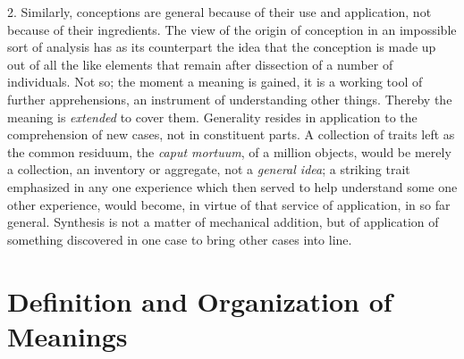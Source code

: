 \documentclass[showtrims,ustradepaper]{memoir}
\begin{document}

2. Similarly, conceptions are general because of their use and
application, not because of their ingredients. The view of the origin of
conception in an impossible sort of analysis has as its counterpart the
idea that the conception is made up out of all the like elements that
remain after dissection of a number of individuals. Not so; the moment a
meaning is gained, it is a working tool of further apprehensions, an
instrument of understanding other things. Thereby the meaning is
\emph{extended} to cover them. Generality resides in application to the
comprehension of new cases, not in constituent parts. A collection of
traits left as the common residuum, the \emph{caput mortuum}, of a
million objects, would be merely a collection, an inventory or
aggregate, not a \emph{general idea}; a striking trait emphasized in any
one experience which then served to help understand some one other
experience, would become, in virtue of that service of application, in
so far general. Synthesis is not a matter of mechanical addition, but of
application of something discovered in one case to bring other cases
into line.

\section{Definition and Organization of Meanings}



\end{document}
